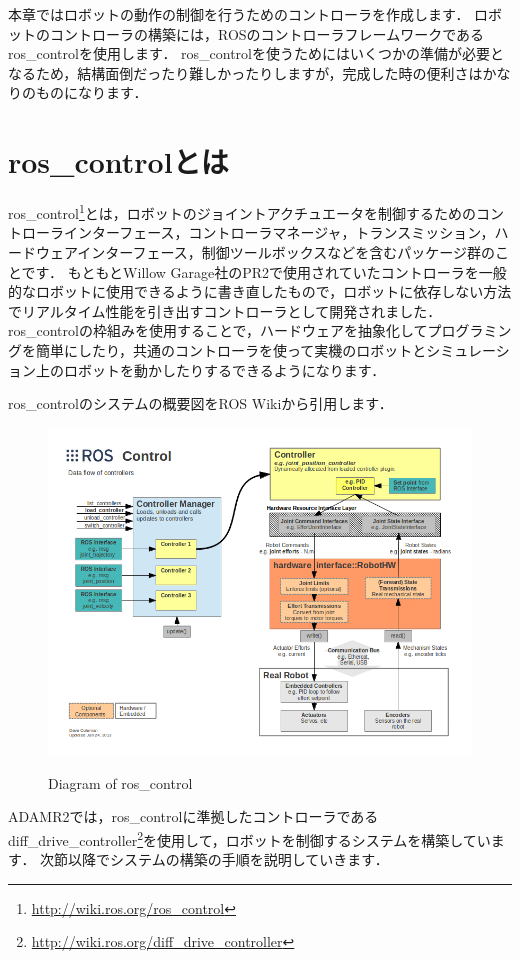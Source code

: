 \documentclass[{../../master}]{subfiles}
\begin{document}
本章ではロボットの動作の制御を行うためのコントローラを作成します．
ロボットのコントローラの構築には，ROSのコントローラフレームワークである\textsf{ros\_control}を使用します．
\textsf{ros\_control}を使うためにはいくつかの準備が必要となるため，結構面倒だったり難しかったりしますが，完成した時の便利さはかなりのものになります．

\section{\textsf{ros\_control}とは}

\textsf{ros\_control}\footnote{\url{http://wiki.ros.org/ros_control}}とは，ロボットのジョイントアクチュエータを制御するためのコントローラインターフェース，コントローラマネージャ，トランスミッション，ハードウェアインターフェース，制御ツールボックスなどを含むパッケージ群のことです．
もともとWillow Garage社のPR2で使用されていたコントローラを一般的なロボットに使用できるように書き直したもので，ロボットに依存しない方法でリアルタイム性能を引き出すコントローラとして開発されました．
\textsf{ros\_control}の枠組みを使用することで，ハードウェアを抽象化してプログラミングを簡単にしたり，共通のコントローラを使って実機のロボットとシミュレーション上のロボットを動かしたりするできるようになります．

\textsf{ros\_control}のシステムの概要図をROS Wikiから引用します．

\begin{figure}[ht]
  \centering
  \includegraphics[height=70truemm]{images/ros_control_diagram.png}
  \label{fig:ros_control_diagram}
  \caption{Diagram of \textsf{ros\_control}}
\end{figure}

ADAMR2では，\textsf{ros\_control}に準拠したコントローラである\textsf{diff\_drive\_controller}\footnote{\url{http://wiki.ros.org/diff_drive_controller}}を使用して，ロボットを制御するシステムを構築しています．
次節以降でシステムの構築の手順を説明していきます．
\end{document}
